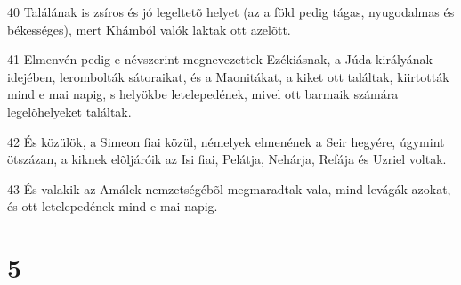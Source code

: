 \par 40 Találának is zsíros és jó legeltetõ helyet (az a föld pedig tágas, nyugodalmas és békességes), mert Khámból valók laktak ott azelõtt.
\par 41 Elmenvén pedig e névszerint megnevezettek Ezékiásnak, a Júda királyának idejében, lerombolták sátoraikat, és a Maonitákat, a kiket ott találtak, kiirtották mind e mai napig, s helyökbe letelepedének, mivel ott barmaik számára legelõhelyeket találtak.
\par 42 És közülök, a Simeon fiai közül, némelyek elmenének a Seir hegyére, úgymint ötszázan, a kiknek elõljáróik az Isi fiai, Pelátja, Nehárja, Refája és Uzriel voltak.
\par 43 És valakik az Amálek nemzetségébõl megmaradtak vala, mind levágák azokat, és ott letelepedének mind e mai napig.

\chapter{5}

